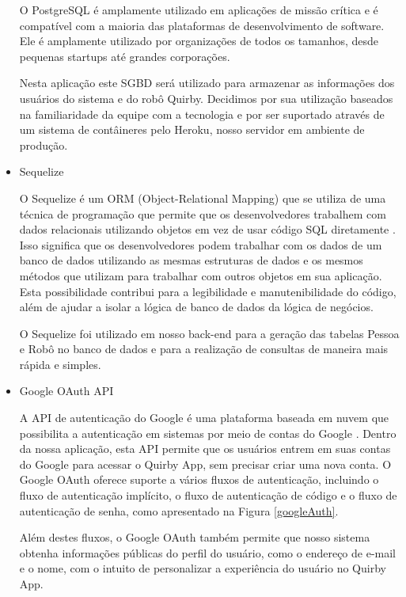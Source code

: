 \begin{itemize}
    O PostgreSQL é amplamente utilizado em aplicações de missão crítica e é compatível com a maioria das plataformas de desenvolvimento de software. Ele é amplamente utilizado por organizações de todos os tamanhos, desde pequenas startups até grandes corporações. 
    
    Nesta aplicação este SGBD será utilizado para armazenar as informações dos usuários do sistema e do robô Quirby. Decidimos por sua utilização baseados na familiaridade da equipe com a tecnologia e por ser suportado através de um sistema de contâineres pelo Heroku, nosso servidor em ambiente de produção.
    
    \item Sequelize
    
    O Sequelize é um ORM (Object-Relational Mapping) que se utiliza de uma técnica de programação que permite que os desenvolvedores trabalhem com dados relacionais utilizando objetos em vez de usar código SQL diretamente \cite{sequelize_2022}. Isso significa que os desenvolvedores podem trabalhar com os dados de um banco de dados utilizando as mesmas estruturas de dados e os mesmos métodos que utilizam para trabalhar com outros objetos em sua aplicação. Esta possibilidade contribui para a legibilidade e manutenibilidade do código, além de ajudar a isolar a lógica de banco de dados da lógica de negócios. 
    
    O Sequelize foi utilizado em nosso back-end para a geração das tabelas Pessoa e Robô no banco de dados e para a realização de consultas de maneira mais rápida e simples.
    
    \item Google OAuth API
    
    A API de autenticação do Google é uma plataforma baseada em nuvem que possibilita a autenticação em sistemas por meio de contas do Google \cite{google_2022}. Dentro da nossa aplicação, esta API permite que os usuários entrem em suas contas do Google para acessar o Quirby App, sem precisar criar uma nova conta. O Google OAuth oferece suporte a vários fluxos de autenticação, incluindo o fluxo de autenticação implícito, o fluxo de autenticação de código e o fluxo de autenticação de senha, como apresentado na Figura \ref{googleAuth}.
    
    Além destes fluxos, o Google OAuth também permite que nosso sistema obtenha informações públicas do perfil do usuário, como o endereço de e-mail e o nome, com o intuito de personalizar a experiência do usuário no Quirby App.
    

\end{itemize}
